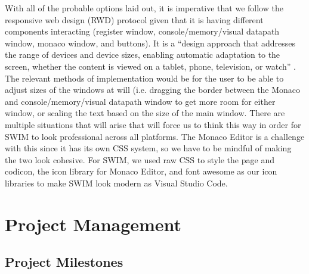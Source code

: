 \documentclass[
    paper=letter,
    parskip=half,
    fontsize=12pt,
    titlepage=firstiscover,
    toc=bibliography,
    numbers=endperiod
]{scrartcl}
\let\oldsection\section
\renewcommand{\section}{\newpage\oldsection}
\begin{document}
With all of the probable options laid out, it is imperative that we
follow the responsive web design (RWD) protocol given that it is having
different components interacting (register window, console/memory/visual
datapath window, monaco window, and buttons). It is a ``design approach
that addresses the range of devices and device sizes, enabling automatic
adaptation to the screen, whether the content is viewed on a tablet,
phone, television, or watch'' \cite{mdn-responsive-design}. The relevant
methods of implementation would be for the user to be able to adjust
sizes of the windows at will (i.e. dragging the border between the
Monaco and console/memory/visual datapath window to get more room for
either window, or scaling the text based on the size of the main window.
There are multiple situations that will arise that will force us to
think this way in order for SWIM to look professional across all
platforms. The Monaco Editor is a challenge with this since it has its
own CSS system, so we have to be mindful of making the two look
cohesive. For SWIM, we used raw CSS to style the page and codicon, the
icon library for Monaco Editor, and font awesome as our icon libraries
to make SWIM look modern as Visual Studio Code.

\section{Project Management}

\subsection{Project Milestones}
\end{document}
